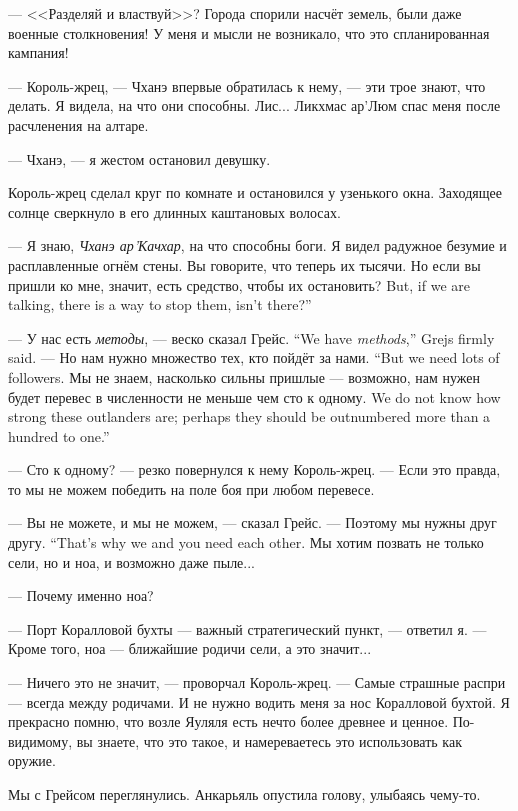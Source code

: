 --- <<Разделяй и властвуй>>?
Города спорили насчёт земель, были даже военные столкновения!
У меня и мысли не возникало, что это спланированная кампания!

--- Король-жрец, --- Чханэ впервые обратилась к нему, --- эти трое знают, что делать.
Я видела, на что они способны.
Лис... Ликхмас ар’Люм спас меня после расчленения на алтаре.

--- Чханэ, --- я жестом остановил девушку.

Король-жрец сделал круг по комнате и остановился у узенького окна.
Заходящее солнце сверкнуло в его длинных каштановых волосах.

--- Я знаю, \emph{Чханэ ар’Качхар}, на что способны боги.
Я видел радужное безумие и расплавленные огнём стены.
Вы говорите, что теперь их тысячи.
{Но если вы пришли ко мне, значит, есть средство, чтобы их остановить?}
{But, if we are talking, there is a way to stop them, isn't there?''}

{--- У нас есть \emph{методы}, --- веско сказал Грейс.}
{``We have \emph{methods},'' Grejs firmly said.}
{--- Но нам нужно множество тех, кто пойдёт за нами.}
{``But we need lots of followers.}
{Мы не знаем, насколько сильны пришлые --- возможно, нам нужен будет перевес в численности не меньше чем сто к одному.}
{We do not know how strong these outlanders are; perhaps they should be outnumbered more than a hundred to one.''}

--- Сто к одному? --- резко повернулся к нему Король-жрец.
--- Если это правда, то мы не можем победить на поле боя при любом перевесе.

--- Вы не можете, и мы не можем, --- сказал Грейс.
{--- Поэтому мы нужны друг другу.}
{``That's why we and you need each other.}
Мы хотим позвать не только сели, но и ноа, и возможно даже пыле...

--- Почему именно ноа?

--- Порт Коралловой бухты --- важный стратегический пункт, --- ответил я.
--- Кроме того, ноа --- ближайшие родичи сели, а это значит...

--- Ничего это не значит, --- проворчал Король-жрец.
--- Самые страшные распри --- всегда между родичами.
И не нужно водить меня за нос Коралловой бухтой.
Я прекрасно помню, что возле Яуляля есть нечто более древнее и ценное.
По-видимому, вы знаете, что это такое, и намереваетесь это использовать как оружие.

Мы с Грейсом переглянулись.
Анкарьяль опустила голову, улыбаясь чему-то.

